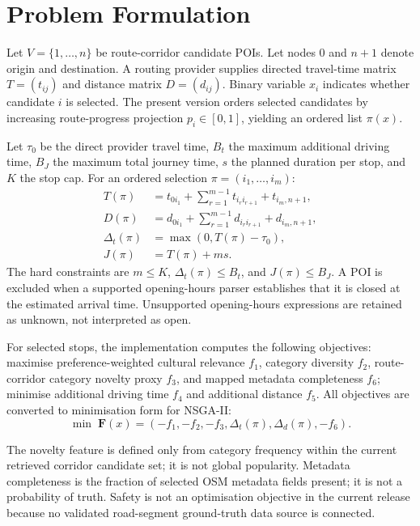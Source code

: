 \documentclass[10pt,conference]{IEEEtran}
\begin{document}
\section{Problem Formulation}
Let $V=\{1,\ldots,n\}$ be route-corridor candidate POIs. Let nodes $0$ and $n+1$ denote origin and destination. A routing provider supplies directed travel-time matrix $T=(t_{ij})$ and distance matrix $D=(d_{ij})$. Binary variable $x_i$ indicates whether candidate $i$ is selected. The present version orders selected candidates by increasing route-progress projection $p_i\in[0,1]$, yielding an ordered list $\pi(x)$.

Let $\tau_0$ be the direct provider travel time, $B_t$ the maximum additional driving time, $B_J$ the maximum total journey time, $s$ the planned duration per stop, and $K$ the stop cap. For an ordered selection $\pi=(i_1,\ldots,i_m)$:
\begin{align}
T(\pi) &= t_{0i_1}+\sum_{r=1}^{m-1}t_{i_ri_{r+1}}+t_{i_m,n+1},\\
D(\pi) &= d_{0i_1}+\sum_{r=1}^{m-1}d_{i_ri_{r+1}}+d_{i_m,n+1},\\
\Delta_t(\pi)&=\max(0,T(\pi)-\tau_0),\\
J(\pi)&=T(\pi)+ms.
\end{align}
The hard constraints are $m\le K$, $\Delta_t(\pi)\le B_t$, and $J(\pi)\le B_J$. A POI is excluded when a supported opening-hours parser establishes that it is closed at the estimated arrival time. Unsupported opening-hours expressions are retained as unknown, not interpreted as open.

For selected stops, the implementation computes the following objectives: maximise preference-weighted cultural relevance $f_1$, category diversity $f_2$, route-corridor category novelty proxy $f_3$, and mapped metadata completeness $f_6$; minimise additional driving time $f_4$ and additional distance $f_5$. All objectives are converted to minimisation form for NSGA-II:
\begin{equation}
\min \; \mathbf{F}(x)=(-f_1,-f_2,-f_3,\Delta_t(\pi),\Delta_d(\pi),-f_6).
\end{equation}

The novelty feature is defined only from category frequency within the current retrieved corridor candidate set; it is not global popularity. Metadata completeness is the fraction of selected OSM metadata fields present; it is not a probability of truth. Safety is not an optimisation objective in the current release because no validated road-segment ground-truth data source is connected.
\end{document}
